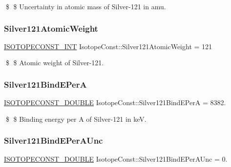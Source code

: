 \$ \$ Uncertainty in atomic mass of Silver-\/121 in amu. \mbox{\label{group___isotope_const-_silver-_ag121_ga3bc02290dd2d6caa2d2917a99626a8ea}} 
\subsubsection{\texorpdfstring{Silver121\+Atomic\+Weight}{Silver121AtomicWeight}}
{\footnotesize\ttfamily \mbox{\hyperlink{group___isotope_const-_macros_ga5f18360b3e99483a35c32d789e62621c}{I\+S\+O\+T\+O\+P\+E\+C\+O\+N\+S\+T\+\_\+\+I\+NT}} Isotope\+Const\+::\+Silver121\+Atomic\+Weight = 121}

\$ \$ Atomic weight of Silver-\/121. \mbox{\label{group___isotope_const-_silver-_ag121_gadf2618b3a1a9513e479bdf9297266b15}} 
\subsubsection{\texorpdfstring{Silver121\+Bind\+E\+PerA}{Silver121BindEPerA}}
{\footnotesize\ttfamily \mbox{\hyperlink{group___isotope_const-_macros_ga8f45a7272ce02c0b4c65c44636ed719a}{I\+S\+O\+T\+O\+P\+E\+C\+O\+N\+S\+T\+\_\+\+D\+O\+U\+B\+LE}} Isotope\+Const\+::\+Silver121\+Bind\+E\+PerA = 8382.}

\$ \$ Binding energy per A of Silver-\/121 in keV. \mbox{\label{group___isotope_const-_silver-_ag121_ga569446697c4a7a59480e3bf6364b8aab}} 
\subsubsection{\texorpdfstring{Silver121\+Bind\+E\+Per\+A\+Unc}{Silver121BindEPerAUnc}}
{\footnotesize\ttfamily \mbox{\hyperlink{group___isotope_const-_macros_ga8f45a7272ce02c0b4c65c44636ed719a}{I\+S\+O\+T\+O\+P\+E\+C\+O\+N\+S\+T\+\_\+\+D\+O\+U\+B\+LE}} Isotope\+Const\+::\+Silver121\+Bind\+E\+Per\+A\+Unc = 0.}

